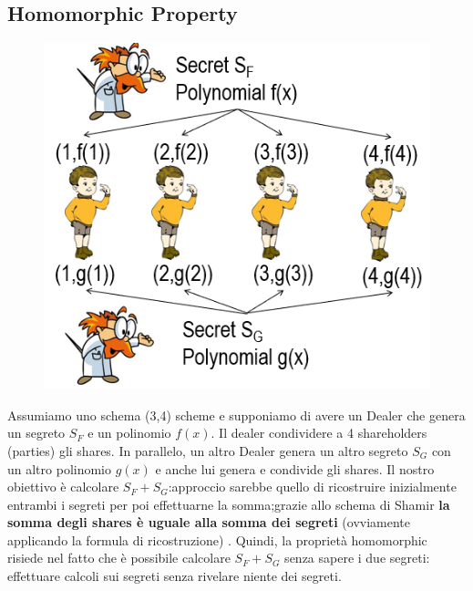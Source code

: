 \documentclass{book}
\begin{document}
\subsection{Homomorphic Property}
\setlength\intextsep{0pt}
\begin{figure}
	\centering
	\includegraphics[scale=0.5]{2021-12-29-21-48-24.png}%
\end{figure}
Assumiamo uno schema (3,4) scheme e supponiamo di avere un Dealer che genera un segreto \(S_{F}\) e un polinomio \(f(x)\).
Il dealer condividere a 4 shareholders (parties) gli shares.
In parallelo, un altro Dealer genera un altro segreto \(S_{G}\) con un altro polinomio \(g(x)\) e anche lui genera e condivide gli shares\@.\newline
Il nostro obiettivo è calcolare \(S_{F}+S_{G}\):\@ approccio sarebbe quello di ricostruire inizialmente entrambi i segreti per poi effettuarne la somma;\@tuttavia grazie allo schema di Shamir \textbf{la somma degli shares è uguale alla somma dei segreti} (ovviamente applicando la formula di ricostruzione) \@.
Quindi, la proprietà homomorphic risiede nel fatto che è possibile calcolare \(S_{F}+S_{G}\) senza sapere i due segreti: effettuare calcoli sui segreti senza rivelare niente dei segreti\@.
\end{document}
